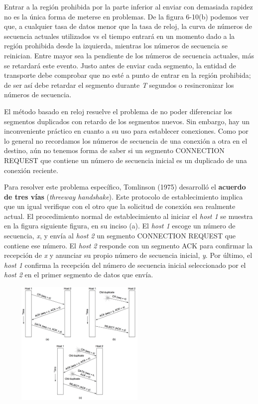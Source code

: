 \documentclass[10pt,a4paper]{report}
\begin{document}
		\par Entrar a la región prohibida por la parte inferior al enviar con demasiada rapidez no es la única forma de meterse en problemas. De la figura 6-10(b) podemos ver que, a cualquier tasa de datos menor que la tasa de reloj, la curva de números de secuencia actuales utilizados vs el tiempo entrará en un momento dado a la región prohibida desde la izquierda, mientras los números de secuencia se reinician. Entre mayor sea la pendiente de los números de secuencia actuales, más se retardará este evento. Justo antes de enviar cada segmento, la entidad de transporte debe comprobar que no esté a punto de entrar en la región prohibida; de ser así debe retardar el segmento durante \textit{T} segundos o resincronizar los números de secuencia.

		\par El método basado en reloj resuelve el problema de no poder diferenciar los segmentos duplicados con retardo de los segmentos nuevos. Sin embargo, hay un inconveniente práctico en cuanto a su uso para establecer conexiones. Como por lo general no recordamos los números de secuencia de una conexión a otra en el destino, aún no tenemos forma de saber si un segmento CONNECTION REQUEST que contiene un número de secuencia inicial es un duplicado de una conexión reciente.

		\par Para resolver este problema específico, Tomlinson (1975) desarrolló el \textbf{acuerdo de tres vías} (\textit{threeway handshake}). Este protocolo de establecimiento implica que un igual verifique con el otro que la solicitud de conexión sea realmente actual. El procedimiento normal de establecimiento al iniciar el \textit{host 1} se muestra en la figura siguiente figura, en su inciso (a). El \textit{host 1} escoge un número de secuencia, \textit{x}, y envía al \textit{host 2} un segmento CONNECTION REQUEST que contiene ese número. El \textit{host 2} responde con un segmento ACK para confirmar la recepción de \textit{x} y anunciar su propio número de secuencia inicial, \textit{y}. Por último, el \textit{host 1} confirma la recepción del número de secuencia inicial seleccionado por el \textit{host 2} en el primer segmento de datos que envía.

		\begin{center} 
			\includegraphics[width=8cm, height=6cm]{./imagenes/tomlinson2.png} 
		\end{center}
\end{document}
